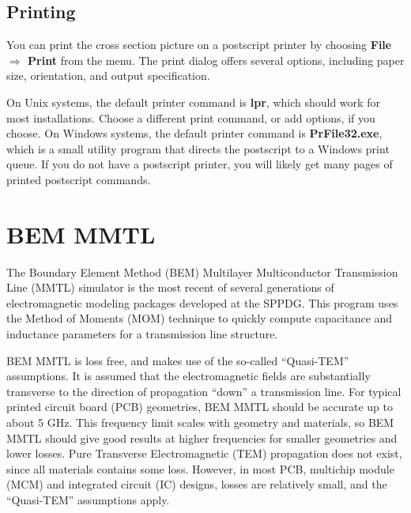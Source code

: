\documentclass{article}
\begin{document}

\subsection {Printing}

You can print the cross section picture on a postscript printer by
choosing {\bf File $\Rightarrow$ Print} from the menu.  The print
dialog offers several options, including paper size, orientation, and
output specification.

On Unix systems, the default printer command is {\bf lpr}, which
should work for most installations.  Choose a different print command,
or add options, if you choose.  On Windows systems, the default
printer command is {\bf PrFile32.exe}, which is a small utility
program that directs the postscript to a Windows print queue.  If you
do not have a postscript printer, you will likely get many pages of
printed postscript commands.



%
%

\section {BEM MMTL}

The Boundary Element Method (BEM) Multilayer Multiconductor
Transmission Line (MMTL) simulator is the most recent of several
generations of electromagnetic modeling packages developed at the
SPPDG.  This program uses the Method of Moments (MOM) technique to
quickly compute capacitance and inductance parameters for a
transmission line structure.  

BEM MMTL is loss free, and makes use of the so-called ``Quasi-TEM''
assumptions.  It is assumed that the electromagnetic fields are
substantially transverse to the direction of propagation ``down'' a
transmission line.  For typical printed circuit board (PCB)
geometries, BEM MMTL should be accurate up to about 5 GHz.  This
frequency limit scales with geometry and materials, so BEM MMTL should
give good results at higher frequencies for smaller geometries and
lower losses.  Pure Transverse Electromagnetic (TEM) propagation does
not exist, since all materials contains some loss.  However, in most
PCB, multichip module (MCM) and integrated circuit (IC) designs,
losses are relatively small, and the ``Quasi-TEM'' assumptions apply.
\end{document}
